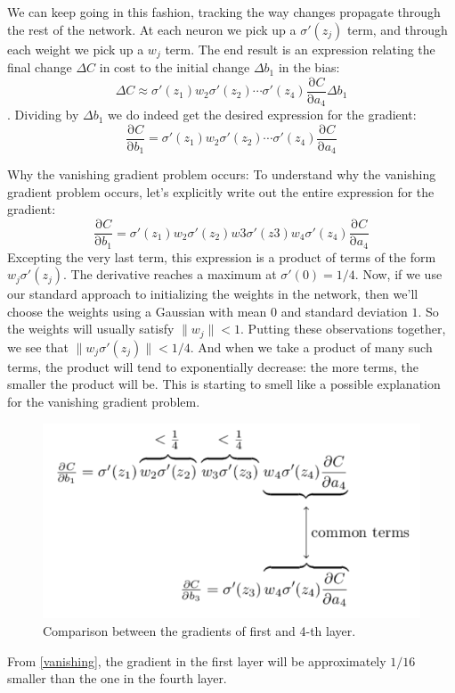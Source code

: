 \documentclass[12pt, letterpaper]{article}
\theoremstyle{definition}
\newcommand{\pr}{\mathrm{\partial}}
\begin{document}
We can keep going in this fashion, tracking the way changes propagate through the rest of the network. At each neuron we pick up a $\sigma'(z_j)$ term, and through each weight we pick up a $w_j$ term. The end result is an expression relating the final change $\Delta C$
 in cost to the initial change $\Delta b_1$ in the bias:
\begin{equation}
\Delta C\approx\sigma'(z_1)w_2\sigma'(z_2)\cdots\sigma'(z_4)\frac{\pr C}{\pr a_4}\Delta b_1
\end{equation}. 
Dividing by $\Delta b_1$ we do indeed get the desired expression for the gradient:
\begin{equation}
\frac{\pr C}{\pr b_1}=\sigma'(z_1)w_2\sigma'(z_2)\cdots\sigma'(z_4)\frac{\pr C}{\pr a_4}
\end{equation}

Why the vanishing gradient problem occurs: To understand why the vanishing gradient problem occurs, let's explicitly write out the entire expression for the gradient:
\begin{equation}
\frac{\pr C}{\pr b_1}=\sigma'(z_1)w_2\sigma'(z_2)w3\sigma'(z3)w_4\sigma'(z_4)\frac{\pr C}{\pr a_4}
\end{equation} 
Excepting the very last term, this expression is a product of terms of the form $w_j\sigma'(z_j)$. The derivative reaches a maximum at $\sigma'(0)=1/4$.  Now, if we use our standard approach to initializing the weights in the network, then we'll choose the weights using a Gaussian with mean $0$ and standard deviation $1$. So the weights will usually satisfy $\|w_j\|<1$. Putting these observations together, we see that $\|w_j \sigma'(z_j)\|<1/4$. And when we take a product of many such terms, the product will tend to exponentially decrease: the more terms, the smaller the product will be. This is starting to smell like a possible explanation for the vanishing gradient problem.
\begin{figure}
\centering
\includegraphics[scale=0.5]{img/vanishinggradient}
\caption{Comparison between the gradients of first and 4-th layer.}
\label{vanishing}
\end{figure}
From \autoref{vanishing}, the gradient in the first layer will be approximately $1/16$ smaller than the one in the fourth layer.
\end{document}
